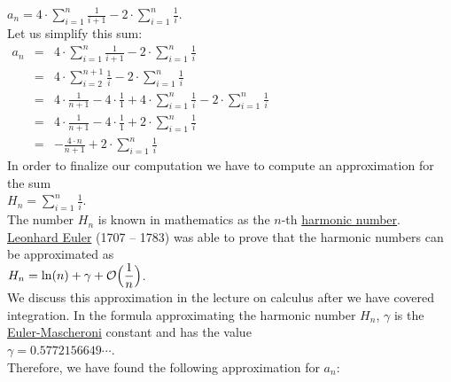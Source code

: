 $\displaystyle a_{n} = 4 \cdot \sum\limits_{i=1}^n \frac{1}{i+1} - 2 \cdot \sum\limits_{i=1}^n \frac{1}{i}$.  
\\[0.2cm]
Let us simplify this sum:
\\[0.2cm]
\hspace*{1.3cm}
$
\begin{array}{lcl}
 a_{n} & = & \displaystyle 4 \cdot \sum_{i=1}^n \frac{1}{i+1} - 2 \cdot \sum_{i=1}^n \frac{1}{i} \\[0.5cm]
       & = & \displaystyle 4 \cdot \sum_{i=2}^{n+1} \frac{1}{i} - 2 \cdot \sum_{i=1}^n \frac{1}{i} \\[0.5cm]
       & = & \displaystyle 4 \cdot \frac{1}{n+1} - 4 \cdot \frac{1}{1} + 4 \cdot \sum_{i=1}^{n} \frac{1}{i} - 2 \cdot \sum_{i=1}^n \frac{1}{i} \\[0.5cm]
       & = & \displaystyle 4 \cdot \frac{1}{n+1} - 4 \cdot \frac{1}{1} + 2 \cdot \sum_{i=1}^{n} \frac{1}{i}  \\[0.5cm]
       & = & \displaystyle - \frac{4 \cdot n}{n+1}  + 2 \cdot \sum_{i=1}^{n} \frac{1}{i}  
\end{array}
$
\\[0.2cm]
In order to finalize our computation we have to compute an approximation for the sum
\\[0.2cm]
\hspace*{1.3cm}
$H_n = \displaystyle\sum\limits_{i=1}^{n}\frac{1}{i}$.
\\[0.2cm] 
The number $H_n$ is known in mathematics as the $n$-th 
\href{http://en.wikipedia.org/wiki/Harmonic_number}{harmonic number}.
\href{http://en.wikipedia.org/wiki/Leonhard_Euler}{Leonhard Euler} (1707 -- 1783) was able to prove
that the harmonic numbers can be approximated as
\\[0.2cm]
\hspace*{1.3cm}
$\displaystyle H_n = \ln(n) + \gamma + \mathcal{O}\Bigl(\frac{1}{n}\Bigr)$. 
\\[0.2cm] 
We discuss this approximation in the lecture on calculus after we have covered integration.  In the
formula approximating the harmonic number $H_n$, $\gamma$ is the
\href{http://en.wikipedia.org/wiki/Euler-Mascheroni_constant}{Euler-Mascheroni} constant and has the 
value
\\[0.2cm]
\hspace*{1.3cm}
$\gamma = 0.5772156649 \cdots$.
\\[0.2cm]
Therefore, we have found the following approximation for $a_n$:
\\[0.2cm]
\hspace*{1.3cm}
